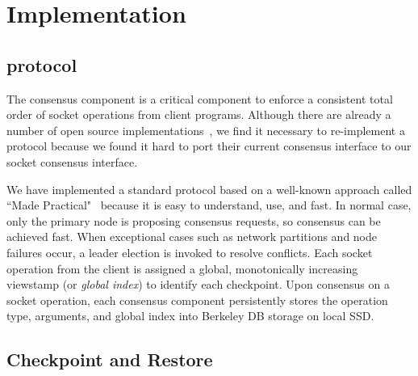 \section{Implementation} \label{sec:impl}


\subsection{\paxos protocol} \label{sec:paxos}
The \paxos consensus component is a critical component to enforce a consistent 
total order of socket operations from client programs. Although there are 
already a number of open source \paxos implementations~\cite{concoord, 
zookeeper, chubby:osdi, libpaxos}, we find it necessary to re-implement a 
\paxos protocol because \xxx we found it hard to port their current consensus 
interface to our socket consensus interface.

We have implemented a standard \paxos protocol based on a well-known approach 
called ``\paxos Made Practical"~\cite{paxos:practical} because it is easy to 
understand, use, and fast. In normal case, only the primary node is proposing 
consensus requests, so consensus can be achieved fast. When exceptional cases 
such as network partitions and node failures occur, a \paxos leader election is 
invoked to resolve conflicts. Each socket operation from the client is assigned 
a global, monotonically increasing viewstamp (or \emph{global index}) to 
identify each checkpoint. Upon consensus on a socket operation, each consensus 
component persistently stores the operation type, arguments, and global index 
into Berkeley DB storage on local SSD.



\subsection{Checkpoint and Restore} \label{sec:checkpoint}


